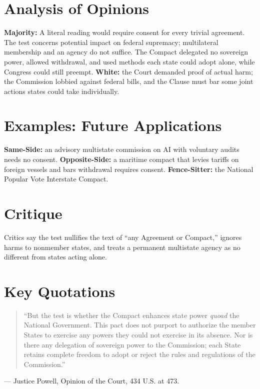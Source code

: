 \documentclass[12pt]{article}
\begin{document}
\section{Analysis of Opinions}
\textbf{Majority:} A literal reading would require consent for every trivial agreement. The test concerns potential impact on federal supremacy; multilateral membership and an agency do not suffice. The Compact delegated no sovereign power, allowed withdrawal, and used methods each state could adopt alone, while Congress could still preempt. \textbf{White:} the Court demanded proof of actual harm; the Commission lobbied against federal bills, and the Clause must bar some joint actions states could take individually.

\section{Examples: Future Applications}
\textbf{Same-Side:} an advisory multistate commission on AI with voluntary audits needs no consent. \textbf{Opposite-Side:} a maritime compact that levies tariffs on foreign vessels and bars withdrawal requires consent. \textbf{Fence-Sitter:} the National Popular Vote Interstate Compact.

\section{Critique}
Critics say the test nullifies the text of ``any Agreement or Compact,'' ignores harms to nonmember states, and treats a permanent multistate agency as no different from states acting alone.

\section{Key Quotations}
\begin{quote}
``But the test is whether the Compact enhances state power \textit{quoad} the National Government. This pact does not purport to authorize the member States to exercise any powers they could not exercise in its absence. Nor is there any delegation of sovereign power to the Commission; each State retains complete freedom to adopt or reject the rules and regulations of the Commission.''
\end{quote}
\noindent --- Justice Powell, Opinion of the Court, 434 U.S. at 473.
\end{document}
